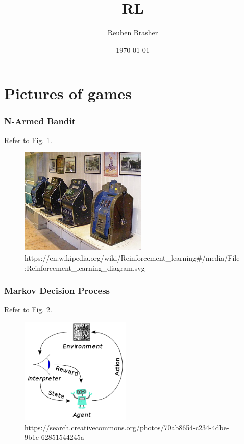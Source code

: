 \documentclass{beamer}
\title{RL}
\author{Reuben Brasher}
\date{\today}
\begin{document}
\frame{\titlepage}

\section[Outline]{}
\frame{\tableofcontents}

\section{Pictures of games}

\frame
{
   \frametitle{N-Armed Bandit}
   
   Refer to Fig. \ref{fig:narmed}.
   
   \begin{figure}[ht]
      \includegraphics[height=2in,keepaspectratio]{images/Slot_machines_at_Wookey_Hole_Caves.JPG}
      \caption{https://en.wikipedia.org/wiki/Reinforcement_learning#/media/File:Reinforcement_learning_diagram.svg} \label{fig:narmed}
   \end{figure}
}

\frame
{
   \frametitle{Markov Decision Process}
   
   Refer to Fig. \ref{fig:mdp}.
   
   \begin{figure}[ht]
      \includegraphics[height=2in,keepaspectratio]{images/Reinforcement_learning_diagram.svg.png}
      \caption{https://search.creativecommons.org/photos/70ab8654-c234-4dbe-9b1c-62851544245a} \label{fig:mdp}
   \end{figure}
}
\end{document}
